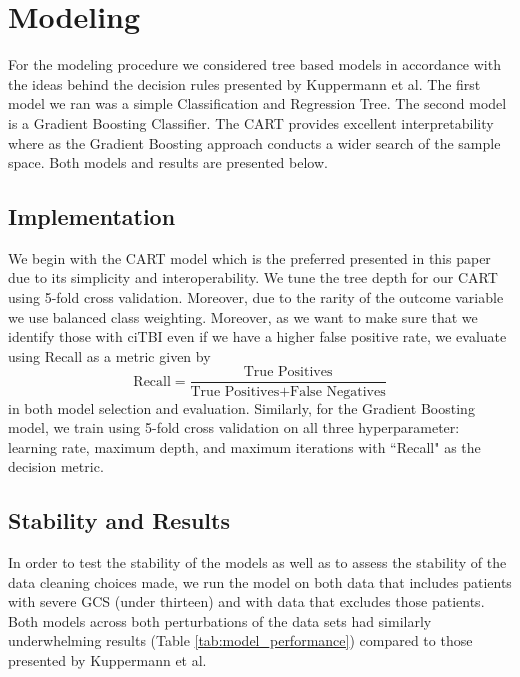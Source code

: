 \documentclass[10pt,letterpaper]{article}
\begin{document}
\section{Modeling}\label{model}

For the modeling procedure we considered tree based models in accordance with the ideas behind the decision rules presented by Kuppermann et al. The first model we ran was a simple Classification and Regression Tree. The second model is a Gradient Boosting Classifier. The CART provides excellent interpretability where as the Gradient Boosting approach conducts a wider search of the sample space. Both models and results are presented below. 

\subsection{Implementation}

We begin with the CART model which is the preferred presented in this paper due to its simplicity and interoperability. We tune the tree depth for our CART using 5-fold cross validation. Moreover, due to the rarity of the outcome variable we use balanced class weighting. Moreover, as we want to make sure that we identify those with ciTBI even if we have a higher false positive rate, we evaluate using Recall as a metric given by $$\text{Recall} = \frac{\text{True Positives}}{\text{True Positives} + \text{False Negatives}}$$ in both model selection and evaluation. Similarly, for the Gradient Boosting model, we train using 5-fold cross validation on all three hyperparameter: learning rate, maximum depth, and maximum iterations with ``Recall" as the decision metric.


\subsection{Stability and Results}
 In order to test the stability of the models as well as to assess the stability of the data cleaning choices made, we run the model on both data that includes patients with severe GCS (under thirteen) and with data that excludes those patients. Both models across both perturbations of the data sets had similarly underwhelming results (Table \ref{tab:model_performance}) compared to those presented by Kuppermann et al. \\
\end{document}
